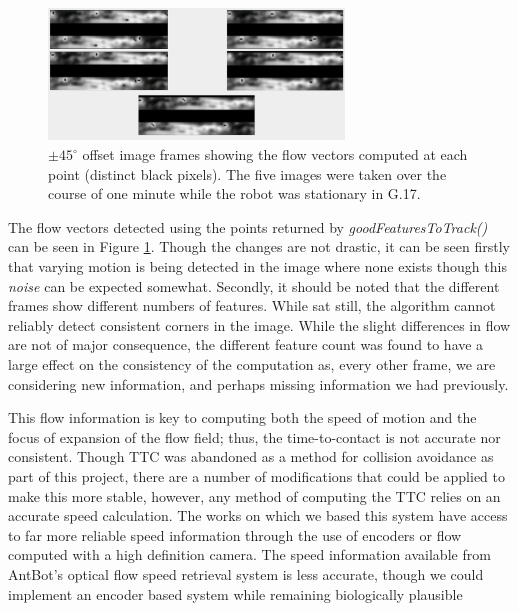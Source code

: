 \documentclass[a4paper,11pt,twoside,openright]{article}
\begin{document}
\begin{figure}
  \centering
  \includegraphics[width=0.7\textwidth]{OpticalFlowInconsistencies}
  \caption{
    \label{fig:ofbad} $\pm 45^{\circ}$ offset image frames showing the flow vectors computed at each point (distinct black
    pixels). The five images were taken over the course of one minute while the robot was stationary in G.17.
  }
\end{figure}

The flow vectors detected using the points returned by \textit{goodFeaturesToTrack()} can be seen in Figure \ref{fig:ofbad}.
Though the changes are not drastic, it can be seen firstly that varying motion is being detected in the image where none
exists though this \textit{noise} can be expected somewhat. Secondly, it should be noted that the different frames show different numbers
of features. While sat still, the algorithm cannot reliably detect consistent corners in the image. While the slight
differences in flow are not of major consequence, the different feature count was found to have a large effect
on the consistency of the computation as, every other frame, we are considering new information, and perhaps missing information
we had previously.
\newline

This flow information is key to computing both the speed of motion and the focus of expansion of the flow field; thus, the
time-to-contact is not accurate nor consistent. Though TTC was abandoned as a method for collision avoidance as part of this
project, there are a number of modifications that could be applied to make this more stable, however, any method of computing the
TTC relies on an accurate speed calculation. The works on which we based this system have access to far more reliable speed information
through the use of encoders or flow computed with a high definition camera. The speed information available from AntBot's optical
flow speed retrieval system is less accurate, though we could implement an encoder based system while remaining biologically
plausible \cite{Wittlinger1965}
\newline
\end{document}
